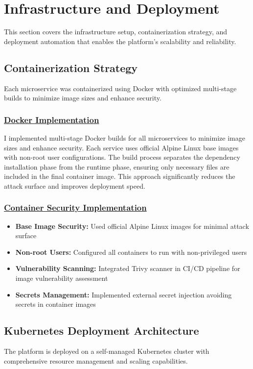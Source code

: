 \section{Infrastructure and Deployment}
This section covers the infrastructure setup, containerization strategy, and deployment automation that enables the platform's scalability and reliability.

\subsection{Containerization Strategy}
Each microservice was containerized using Docker with optimized multi-stage builds to minimize image sizes and enhance security.

\subsubsection*{\underline{Docker Implementation}}
I implemented multi-stage Docker builds for all microservices to minimize image sizes and enhance security. Each service uses official Alpine Linux base images with non-root user configurations. The build process separates the dependency installation phase from the runtime phase, ensuring only necessary files are included in the final container image. This approach significantly reduces the attack surface and improves deployment speed.

\subsubsection*{\underline{Container Security Implementation}}
\begin{itemize}
    \item \textbf{Base Image Security:} Used official Alpine Linux images for minimal attack surface
    \item \textbf{Non-root Users:} Configured all containers to run with non-privileged users
    \item \textbf{Vulnerability Scanning:} Integrated Trivy scanner in CI/CD pipeline for image vulnerability assessment
    \item \textbf{Secrets Management:} Implemented external secret injection avoiding secrets in container images
\end{itemize}

\subsection{Kubernetes Deployment Architecture}
The platform is deployed on a self-managed Kubernetes cluster with comprehensive resource management and scaling capabilities.

